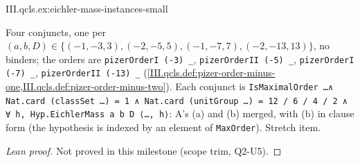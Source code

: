 \begin{example}[$D=3,5,7,13$; stretch]
\end{example}
\begin{tfformal}{III.qcls.ex:eichler-mass-instances-small}
\begin{tffidelity}
Four conjuncts, one per $(a,b,D)\in\{(-1,-3,3),(-2,-5,5),(-1,-7,7),(-2,-13,13)\}$, no binders; the orders are \texttt{pizerOrderI (-3) \_}, \texttt{pizerOrderII (-5) \_}, \texttt{pizerOrderI (-7) \_}, \texttt{pizerOrderII (-13) \_} (\cref{III.qcls.def:pizer-order-minus-one,III.qcls.def:pizer-order-minus-two}). Each conjunct is \texttt{IsMaximalOrder \dots ∧ Nat.card (classSet \dots) = 1 ∧ Nat.card (unitGroup \dots) = 12\,/\,6\,/\,4\,/\,2 ∧ ∀ h, Hyp.EichlerMass a b D ⟨\dots, h⟩}: A's (a) and (b) merged, with (b) in clause form (the hypothesis is indexed by an element of \texttt{MaxOrder}). Stretch item.
\end{tffidelity}
\end{tfformal}
\begin{proof}[Lean proof]
Not proved in this milestone (scope trim, Q2-U5).
\end{proof}

